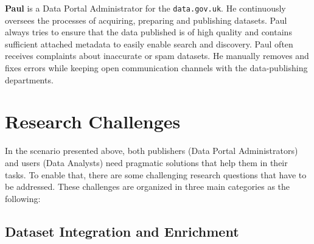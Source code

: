 \documentclass[a4paper,11pt,twoside]{ThesisStyle}
\begin{document}
\textbf{Paul} is a Data Portal Administrator for the \texttt{data.gov.uk}. He continuously oversees the processes of acquiring, preparing and publishing datasets. Paul always tries to ensure that the data published is of high quality and contains sufficient attached metadata to easily enable search and discovery. Paul often receives complaints about inaccurate or spam datasets. He manually removes and fixes errors while keeping open communication channels with the data-publishing departments.


\section{Research Challenges} \label{section:challenges}

In the scenario presented above, both publishers (Data Portal Administrators) and users (Data Analysts) need pragmatic solutions that help them in their tasks. To enable that, there are some challenging research questions that have to be addressed. These challenges are organized in three main categories as the following:

\subsection{Dataset Integration and Enrichment}
\end{document}
